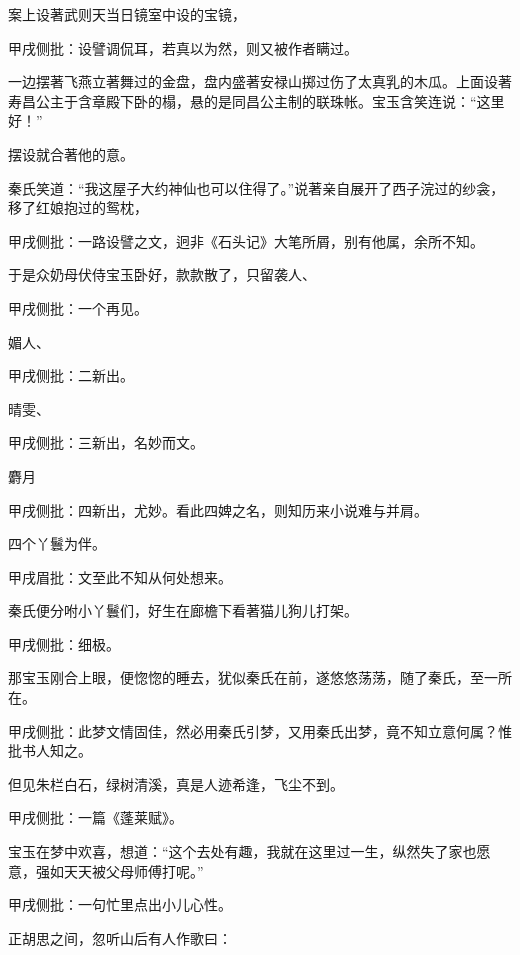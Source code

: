 \begin{parag}

    案上设著武则天当日镜室中设的宝镜，\begin{note}甲戌侧批：设譬调侃耳，若真以为然，则又被作者瞒过。\end{note}一边摆著飞燕立著舞过的金盘，盘内盛著安禄山掷过伤了太真乳的木瓜。上面设著寿昌公主于含章殿下卧的榻，悬的是同昌公主制的联珠帐。宝玉含笑连说：“这里好！”\begin{note}摆设就合著他的意。\end{note}秦氏笑道：“我这屋子大约神仙也可以住得了。”说著亲自展开了西子浣过的纱衾，移了红娘抱过的鸳枕，\begin{note}甲戌侧批：一路设譬之文，迥非《石头记》大笔所屑，别有他属，余所不知。\end{note}于是众奶母伏侍宝玉卧好，款款散了，只留袭人、\begin{note}甲戌侧批：一个再见。\end{note}媚人、\begin{note}甲戌侧批：二新出。\end{note}晴雯、\begin{note}甲戌侧批：三新出，名妙而文。\end{note}麝月\begin{note}甲戌侧批：四新出，尤妙。看此四婢之名，则知历来小说难与并肩。\end{note}四个丫鬟为伴。\begin{note}甲戌眉批：文至此不知从何处想来。\end{note}秦氏便分咐小丫鬟们，好生在廊檐下看著猫儿狗儿打架。\begin{note}甲戌侧批：细极。\end{note}
\end{parag}


\begin{parag}


    那宝玉刚合上眼，便惚惚的睡去，犹似秦氏在前，遂悠悠荡荡，随了秦氏，至一所在。\begin{note}甲戌侧批：此梦文情固佳，然必用秦氏引梦，又用秦氏出梦，竟不知立意何属？惟批书人知之。\end{note}但见朱栏白石，绿树清溪，真是人迹希逢，飞尘不到。\begin{note}甲戌侧批：一篇《蓬莱赋》。\end{note}宝玉在梦中欢喜，想道：“这个去处有趣，我就在这里过一生，纵然失了家也愿意，强如天天被父母师傅打呢。”\begin{note}甲戌侧批：一句忙里点出小儿心性。\end{note}正胡思之间，忽听山后有人作歌曰：
\end{parag}

